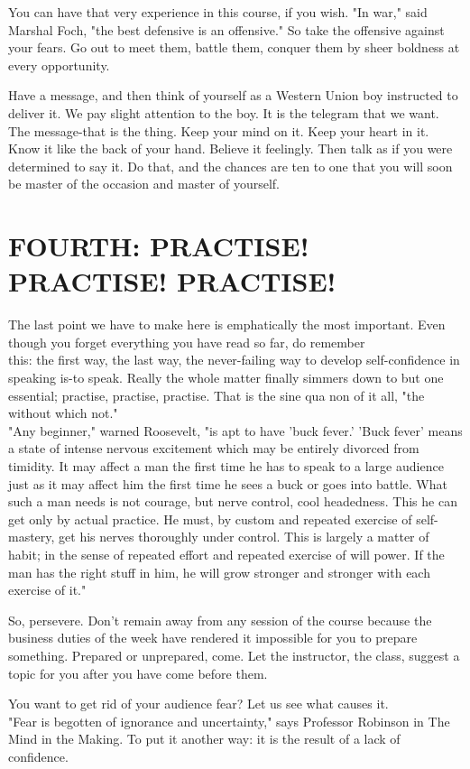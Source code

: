 \documentclass[10pt]{article}
\begin{document}
You can have that very experience in this course, if you wish. "In war," said Marshal Foch, "the best defensive is an offensive." So take the offensive against your fears. Go out to meet them, battle them, conquer them by sheer boldness at every opportunity.

Have a message, and then think of yourself as a Western Union boy instructed to deliver it. We pay slight attention to the boy. It is the telegram that we want. The message-that is the thing. Keep your mind on it. Keep your heart in it. Know it like the back of your hand. Believe it feelingly. Then talk as if you were determined to say it. Do that, and the chances are ten to one that you will soon be master of the occasion and master of yourself.

\section*{FOURTH: PRACTISE! PRACTISE! PRACTISE!}
The last point we have to make here is emphatically the most important. Even though you forget everything you have read so far, do remember\\
this: the first way, the last way, the never-failing way to develop self-confidence in speaking is-to speak. Really the whole matter finally simmers down to but one essential; practise, practise, practise. That is the sine qua non of it all, "the without which not."\\
"Any beginner," warned Roosevelt, "is apt to have 'buck fever.' 'Buck fever' means a state of intense nervous excitement which may be entirely divorced from timidity. It may affect a man the first time he has to speak to a large audience just as it may affect him the first time he sees a buck or goes into battle. What such a man needs is not courage, but nerve control, cool headedness. This he can get only by actual practice. He must, by custom and repeated exercise of self-mastery, get his nerves thoroughly under control. This is largely a matter of habit; in the sense of repeated effort and repeated exercise of will power. If the man has the right stuff in him, he will grow stronger and stronger with each exercise of it."

So, persevere. Don't remain away from any session of the course because the business duties of the week have rendered it impossible for you to prepare something. Prepared or unprepared, come. Let the instructor, the class, suggest a topic for you after you have come before them.

You want to get rid of your audience fear? Let us see what causes it.\\
"Fear is begotten of ignorance and uncertainty," says Professor Robinson in The Mind in the Making. To put it another way: it is the result of a lack of confidence.
\end{document}
